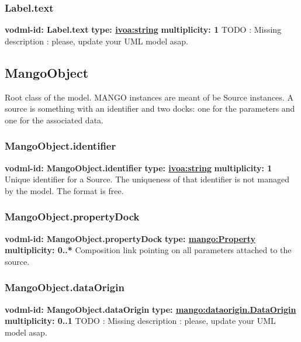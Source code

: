     \subsubsection{Label.text}
      \textbf{vodml-id: Label.text} \newline
      \textbf{type: \hyperref[sect:ivoa]{ivoa:string}} \newline
      \textbf{multiplicity: 1} \newline
      TODO : Missing description : please, update your UML model asap.

  \subsection{MangoObject}
  \label{sect:MangoObject}
    Root class of the model. MANGO instances are meant of be Source instances. A source is something with an identifier and two docks: one for the parameters and one for the associated data.

    \subsubsection{MangoObject.identifier}
      \textbf{vodml-id: MangoObject.identifier} \newline
      \textbf{type: \hyperref[sect:ivoa]{ivoa:string}} \newline
      \textbf{multiplicity: 1} \newline
      Unique identifier for a Source. The uniqueness of that identifier is not managed by the model. The format is free.

    \subsubsection{MangoObject.propertyDock}
      \textbf{vodml-id: MangoObject.propertyDock} \newline
      \textbf{type: \hyperref[sect:Property]{mango:Property}} \newline
      \textbf{multiplicity: 0..*} \newline
      Composition link pointing on all parameters attached to the source.

    \subsubsection{MangoObject.dataOrigin}
      \textbf{vodml-id: MangoObject.dataOrigin} \newline
      \textbf{type: \hyperref[sect:dataorigin.DataOrigin]{mango:dataorigin.DataOrigin}} \newline
      \textbf{multiplicity: 0..1} \newline
      TODO : Missing description : please, update your UML model asap.

